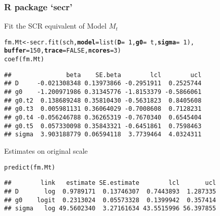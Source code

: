\documentclass[color=usenames,dvipsnames]{beamer}\usepackage[]{graphicx}\usepackage[]{color}
\makeatletter
\newcommand{\hlnum}[1]{\textcolor[rgb]{0.69,0.494,0}{#1}}%
\newcommand{\hlopt}[1]{\textcolor[rgb]{0,0,0}{#1}}%
\newcommand{\hlstd}[1]{\textcolor[rgb]{0,0,0}{#1}}%
\newcommand{\hlkwb}[1]{\textcolor[rgb]{0,0.341,0.682}{#1}}%
\newcommand{\hlkwc}[1]{\textcolor[rgb]{0,0,0}{\textbf{#1}}}%
\newcommand{\hlkwd}[1]{\textcolor[rgb]{0.004,0.004,0.506}{#1}}%
\newenvironment{kframe}{%
 \def\at@end@of@kframe{}%
 \ifinner\ifhmode%
  \def\at@end@of@kframe{\end{minipage}}%
  \begin{minipage}{\columnwidth}%
 \fi\fi%
 \def\FrameCommand##1{\hskip\@totalleftmargin \hskip-\fboxsep
 \colorbox{shadecolor}{##1}\hskip-\fboxsep
     \hskip-\linewidth \hskip-\@totalleftmargin \hskip\columnwidth}%
 \MakeFramed {\advance\hsize-\width
   \@totalleftmargin\z@ \linewidth\hsize
   \@setminipage}}%
 {\par\unskip\endMakeFramed%
 \at@end@of@kframe}
\newenvironment{knitrout}{}{} %
\makeatother
\begin{document}
\begin{frame}[fragile]
  \frametitle{R package `secr'}
  Fit the SCR equivalent of Model $M_t$
\begin{knitrout}\scriptsize
{}\color{fgcolor}\begin{kframe}
\begin{alltt}
\hlstd{fm.Mt} \hlkwb{<-} \hlkwd{secr.fit}\hlstd{(sch,} \hlkwc{model}\hlstd{=}\hlkwd{list}\hlstd{(}\hlkwc{D}\hlstd{=}\hlopt{~}\hlnum{1}\hlstd{,} \hlkwc{g0}\hlstd{=}\hlopt{~}\hlstd{t,} \hlkwc{sigma}\hlstd{=}\hlopt{~}\hlnum{1}\hlstd{),}
                  \hlkwc{buffer}\hlstd{=}\hlnum{150}\hlstd{,} \hlkwc{trace}\hlstd{=}\hlnum{FALSE}\hlstd{,} \hlkwc{ncores}\hlstd{=}\hlnum{3}\hlstd{)}
\hlkwd{coef}\hlstd{(fm.Mt)}
\end{alltt}
\begin{verbatim}
##               beta    SE.beta        lcl        ucl
## D     -0.021308348 0.13973866 -0.2951911  0.2525744
## g0    -1.200971986 0.31345776 -1.8153379 -0.5866061
## g0.t2  0.138689248 0.35810430 -0.5631823  0.8405608
## g0.t3  0.005981131 0.36064029 -0.7008608  0.7128231
## g0.t4 -0.056246788 0.36265319 -0.7670340  0.6545404
## g0.t5  0.057330098 0.35843321 -0.6451861  0.7598463
## sigma  3.903188779 0.06594118  3.7739464  4.0324311
\end{verbatim}
\end{kframe}
\end{knitrout}
\pause
\vfill
Estimates on original scale
\begin{knitrout}\scriptsize
{}\color{fgcolor}\begin{kframe}
\begin{alltt}
\hlkwd{predict}\hlstd{(fm.Mt)}
\end{alltt}
\begin{verbatim}
##        link   estimate SE.estimate        lcl       ucl
## D       log  0.9789171  0.13746307  0.7443893  1.287335
## g0    logit  0.2313024  0.05573328  0.1399942  0.357414
## sigma   log 49.5602340  3.27161634 43.5515996 56.397855
\end{verbatim}
\end{kframe}
\end{knitrout}
\end{frame}
\end{document}
